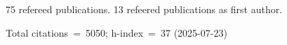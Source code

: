 75 refereed publications. 13 refeered publications as first author.

Total citations~=~5050; h-index~=~37 (2025-07-23)
